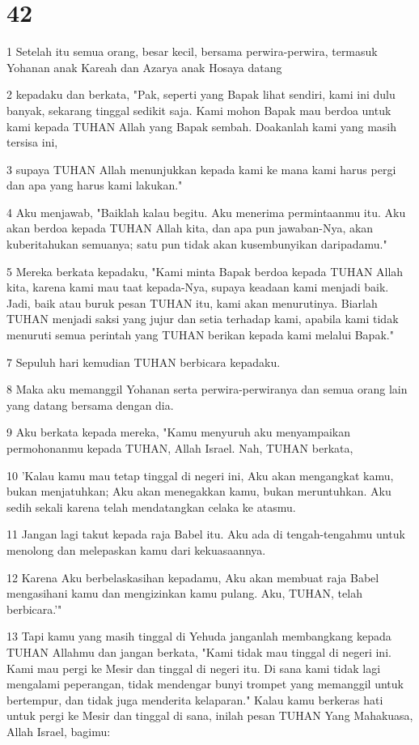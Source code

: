 \chapter{42}

\par 1 Setelah itu semua orang, besar kecil, bersama perwira-perwira, termasuk Yohanan anak Kareah dan Azarya anak Hosaya datang
\par 2 kepadaku dan berkata, "Pak, seperti yang Bapak lihat sendiri, kami ini dulu banyak, sekarang tinggal sedikit saja. Kami mohon Bapak mau berdoa untuk kami kepada TUHAN Allah yang Bapak sembah. Doakanlah kami yang masih tersisa ini,
\par 3 supaya TUHAN Allah menunjukkan kepada kami ke mana kami harus pergi dan apa yang harus kami lakukan."
\par 4 Aku menjawab, "Baiklah kalau begitu. Aku menerima permintaanmu itu. Aku akan berdoa kepada TUHAN Allah kita, dan apa pun jawaban-Nya, akan kuberitahukan semuanya; satu pun tidak akan kusembunyikan daripadamu."
\par 5 Mereka berkata kepadaku, "Kami minta Bapak berdoa kepada TUHAN Allah kita, karena kami mau taat kepada-Nya, supaya keadaan kami menjadi baik. Jadi, baik atau buruk pesan TUHAN itu, kami akan menurutinya. Biarlah TUHAN menjadi saksi yang jujur dan setia terhadap kami, apabila kami tidak menuruti semua perintah yang TUHAN berikan kepada kami melalui Bapak."
\par 7 Sepuluh hari kemudian TUHAN berbicara kepadaku.
\par 8 Maka aku memanggil Yohanan serta perwira-perwiranya dan semua orang lain yang datang bersama dengan dia.
\par 9 Aku berkata kepada mereka, "Kamu menyuruh aku menyampaikan permohonanmu kepada TUHAN, Allah Israel. Nah, TUHAN berkata,
\par 10 'Kalau kamu mau tetap tinggal di negeri ini, Aku akan mengangkat kamu, bukan menjatuhkan; Aku akan menegakkan kamu, bukan meruntuhkan. Aku sedih sekali karena telah mendatangkan celaka ke atasmu.
\par 11 Jangan lagi takut kepada raja Babel itu. Aku ada di tengah-tengahmu untuk menolong dan melepaskan kamu dari kekuasaannya.
\par 12 Karena Aku berbelaskasihan kepadamu, Aku akan membuat raja Babel mengasihani kamu dan mengizinkan kamu pulang. Aku, TUHAN, telah berbicara.'"
\par 13 Tapi kamu yang masih tinggal di Yehuda janganlah membangkang kepada TUHAN Allahmu dan jangan berkata, "Kami tidak mau tinggal di negeri ini. Kami mau pergi ke Mesir dan tinggal di negeri itu. Di sana kami tidak lagi mengalami peperangan, tidak mendengar bunyi trompet yang memanggil untuk bertempur, dan tidak juga menderita kelaparan." Kalau kamu berkeras hati untuk pergi ke Mesir dan tinggal di sana, inilah pesan TUHAN Yang Mahakuasa, Allah Israel, bagimu:
